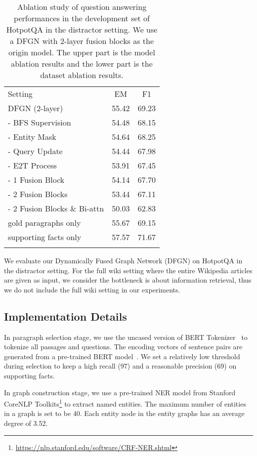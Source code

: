 \documentclass[11pt,a4paper]{article}
\begin{document}
\begin{table}[t]
    \centering 
	\begin{tabular}{lcc}
	    Setting & EM & F1\\ \Xhline{1pt}
	    DFGN (2-layer) & 55.42 & 69.23 \\
	    - BFS Supervision & 54.48 & 68.15 \\
	    - Entity Mask & 54.64 & 68.25 \\
	    - Query Update & 54.44 & 67.98 \\
	    - E2T Process & 53.91 & 67.45 \\
	    - 1 Fusion Block & 54.14 & 67.70 \\
	    - 2 Fusion Blocks & 53.44 & 67.11 \\
	    - 2 Fusion Blocks \& Bi-attn & 50.03 & 62.83 \\
		\Xhline{1pt}
		gold paragraphs only & 55.67 & 69.15 \\
		supporting facts only & 57.57 & 71.67 \\
		\Xhline{1pt}
	\end{tabular}
	\caption{Ablation study of question answering performances in the development set of HotpotQA in the distractor setting. We use a DFGN with 2-layer fusion blocks as the origin model. The upper part is the model ablation results and the lower part is the dataset ablation results.}
	\label{table:ablation}
\end{table}

We evaluate our Dynamically Fused Graph Network (DFGN) on HotpotQA \cite{yang2018hotpotqa} in the distractor setting. For the full wiki setting where the entire Wikipedia articles are given as input, we consider the bottleneck is about information retrieval, thus we do not include the full wiki setting in our experiments.

\subsection{Implementation Details}


In paragraph selection stage, we use the uncased version of BERT Tokenizer~\cite{devlin2018bert} to tokenize all passages and questions. 
The encoding vectors of sentence pairs are generated from a pre-trained BERT model~\cite{devlin2018bert}.
We set a relatively low threshold during selection to keep a high recall (97) and a reasonable precision (69) on supporting facts.

In graph construction stage, we use a pre-trained NER model from Stanford CoreNLP Toolkits\footnote{\url{https://nlp.stanford.edu/software/CRF-NER.shtml}} \cite{manning2014stanford} to extract named entities. The maximum number of entities in a graph is set to be 40. Each entity node in the entity graphs has an average degree of 3.52.
\end{document}
